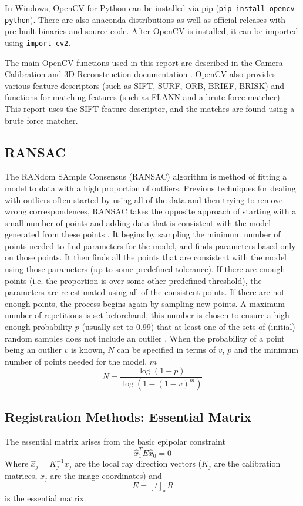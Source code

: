 \documentclass[12pt,a4paper]{article}
\newcommand{\terminal}[1]{\texttt{#1}}
\begin{document}
    In Windows, OpenCV for Python can be installed via pip (\terminal{pip install opencv-python}). There are also anaconda distributions as well as official releases with pre-built binaries and source code. After OpenCV is installed, it can be imported using \terminal{import cv2}. 
     
    The main OpenCV functions used in this report are described in the Camera Calibration and 3D Reconstruction documentation \cite{openCV-docs}. OpenCV also provides various feature descriptors (such as SIFT, SURF, ORB, BRIEF, BRISK) and functions for matching features (such as FLANN and a brute force matcher) \cite{openCV-feat}. This report uses the SIFT feature descriptor, and the matches are found using a brute force matcher.

  \subsection{RANSAC}
    \label{ssec: BI RANSAC}
    The RANdom SAmple Consensus (RANSAC) algorithm is method of fitting a model to data with a high proportion of outliers. Previous techniques for dealing with outliers often started by using all of the data and then trying to remove wrong correspondences, RANSAC takes the opposite approach of starting with a small number of points and adding data that is consistent with the model generated from these points \cite{fischler1981random}. It begins by sampling the minimum number of points needed to find parameters for the model, and finds parameters based only on those points. It then finds all the points that are consistent with the model using those parameters (up to some predefined tolerance). If there are enough points (i.e. the proportion is over some other predefined threshold), the parameters are re-estimated using all of the consistent points. If there are not enough points, the process begins again by sampling new points. A maximum number of repetitions is set beforehand, this number is chosen to ensure a high enough probability $p$ (usually set to 0.99) that at least one of the sets of (initial) random samples does not include an outlier \cite{derpanis2010overview}. When the probability of a point being an outlier $v$ is known, $N$ can be specified in terms of $v$, $p$ and the minimum number of points needed for the model, $m$ \cite{derpanis2010overview}
    \[
    N = \frac{\log(1-p)}{\log(1-(1-v)^m)}
    \]

  \subsection{Registration Methods: Essential Matrix}
    \label{ssec: BI EM}
    The essential matrix arises from the basic epipolar constraint \cite{szeliski2010computer}
    \[
    \hat{x}_1^T E \hat{x}_0 = 0
    \]
    Where $\hat{x}_j = K^{-1}_j x_j$ are the local ray direction vectors ($K_j$ are the calibration matrices, $x_j$ are the image coordinates) and
    \[
    E = [t]_x R
    \]
    is the essential matrix. 
     
\end{document}
